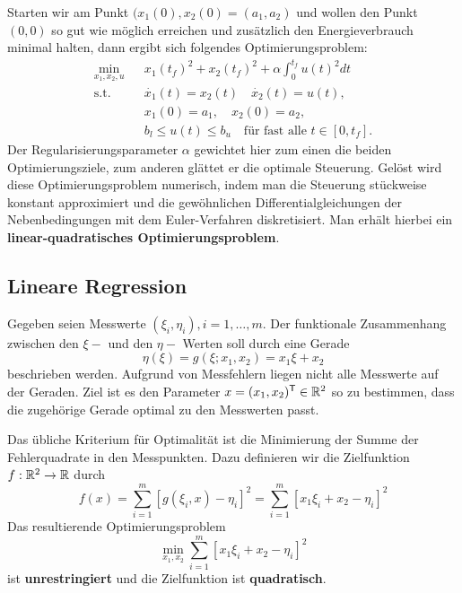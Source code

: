 
Starten wir am Punkt $(x_1(0),x_2(0)=(a_1,a_2)$ und wollen den Punkt $(0,0)$ so gut wie m\"oglich erreichen und zus\"atzlich den Energieverbrauch minimal halten, dann ergibt sich folgendes Optimierungsproblem:
\begin{eqnarray*}
		\min_{x_1,x_2,u} & & x_1(t_f)^2+x_2(t_f)^2+\alpha\int_{0}^{t_f}u(t)^2dt\\
		\text{s.t.} & & \dot{x_1}(t) = x_2(t)  \quad \dot{x_2}(t)=u(t),\\
		& & x_1(0)=a_1, \quad x_2(0)=a_2,\\
		& & b_l\leq u(t) \leq b_u \quad \text{f\"ur fast alle }t\in\left[0,t_f\right].
\end{eqnarray*}
Der Regularisierungsparameter $\alpha$ gewichtet hier zum einen die beiden Optimierungsziele, zum anderen gl\"attet er die optimale Steuerung. Gel\"ost wird diese Optimierungsproblem numerisch, indem man die Steuerung st\"uckweise konstant approximiert und die gew\"ohnlichen Differentialgleichungen der Nebenbedingungen mit dem Euler-Verfahren diskretisiert. Man erh\"alt hierbei ein \textbf{linear-quadratisches Optimierungsproblem}.
	


\subsection{Lineare Regression}
Gegeben seien Messwerte $(\xi_i,\eta_i), i=1,\dots,m$. Der funktionale Zusammenhang zwischen den $\xi-$ und den $\eta-$ Werten soll durch eine Gerade
\begin{equation*}
	\eta(\xi)=g(\xi;x_1,x_2)= x_1\xi+x_2
\end{equation*}
beschrieben werden. Aufgrund von Messfehlern liegen nicht alle Messwerte auf der Geraden. Ziel ist es den Parameter $x=(x_1,x_2)^\mathsf{T}\in\mathbb R^2$ so zu bestimmen, dass die zugeh\"orige Gerade {\glqq optimal\grqq} zu den Messwerten passt.

Das \"ubliche Kriterium f\"ur Optimalit\"at ist die Minimierung der Summe der Fehlerquadrate in den Messpunkten. Dazu definieren wir die Zielfunktion $f: \mathbb R^2 \to \mathbb R$ durch
\begin{equation*}
	f(x)= \sum\limits_{i=1}^m\left[g(\xi_i,x) - \eta_i \right]^2 = \sum\limits_{i=1}^m\left[x_1\xi_i+x_2-\eta_i \right]^2
\end{equation*}
Das resultierende Optimierungsproblem
\begin{equation*}
	\min_{x_1,x_2}\sum\limits_{i=1}^m\left[x_1\xi_i+x_2-\eta_i \right]^2
\end{equation*}
ist \textbf{unrestringiert} und die Zielfunktion ist \textbf{quadratisch}.
\newpage

